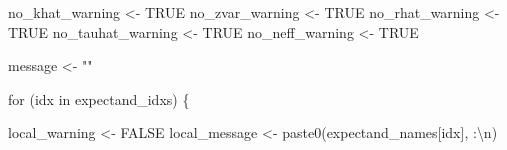 \documentclass[
  letterpaper,
  DIV=11,
  numbers=noendperiod]{scrartcl}
\newenvironment{Shaded}{\begin{snugshade}}{\end{snugshade}}
\newcommand{\ConstantTok}[1]{\textcolor[rgb]{0.56,0.35,0.01}{#1}}
\newcommand{\ControlFlowTok}[1]{\textcolor[rgb]{0.00,0.23,0.31}{#1}}
\newcommand{\FunctionTok}[1]{\textcolor[rgb]{0.28,0.35,0.67}{#1}}
\newcommand{\NormalTok}[1]{\textcolor[rgb]{0.00,0.23,0.31}{#1}}
\newcommand{\OtherTok}[1]{\textcolor[rgb]{0.00,0.23,0.31}{#1}}
\newcommand{\SpecialCharTok}[1]{\textcolor[rgb]{0.37,0.37,0.37}{#1}}
\newcommand{\StringTok}[1]{\textcolor[rgb]{0.13,0.47,0.30}{#1}}
\begin{document}
\begin{Shaded}
\begin{Highlighting}[]
\NormalTok{  no\_khat\_warning }\OtherTok{\textless{}{-}} \ConstantTok{TRUE}
\NormalTok{  no\_zvar\_warning }\OtherTok{\textless{}{-}} \ConstantTok{TRUE}
\NormalTok{  no\_rhat\_warning }\OtherTok{\textless{}{-}} \ConstantTok{TRUE}
\NormalTok{  no\_tauhat\_warning }\OtherTok{\textless{}{-}} \ConstantTok{TRUE}
\NormalTok{  no\_neff\_warning }\OtherTok{\textless{}{-}} \ConstantTok{TRUE}

\NormalTok{  message }\OtherTok{\textless{}{-}} \StringTok{""}

  \ControlFlowTok{for}\NormalTok{ (idx }\ControlFlowTok{in}\NormalTok{ expectand\_idxs) \{}

\NormalTok{    local\_warning }\OtherTok{\textless{}{-}} \ConstantTok{FALSE}
\NormalTok{    local\_message }\OtherTok{\textless{}{-}} \FunctionTok{paste0}\NormalTok{(expectand\_names[idx], }\StringTok{\textquotesingle{}:}\SpecialCharTok{\textbackslash{}n}\StringTok{\textquotesingle{}}\NormalTok{)}
  

\end{Highlighting}
\end{Shaded}
\end{document}
